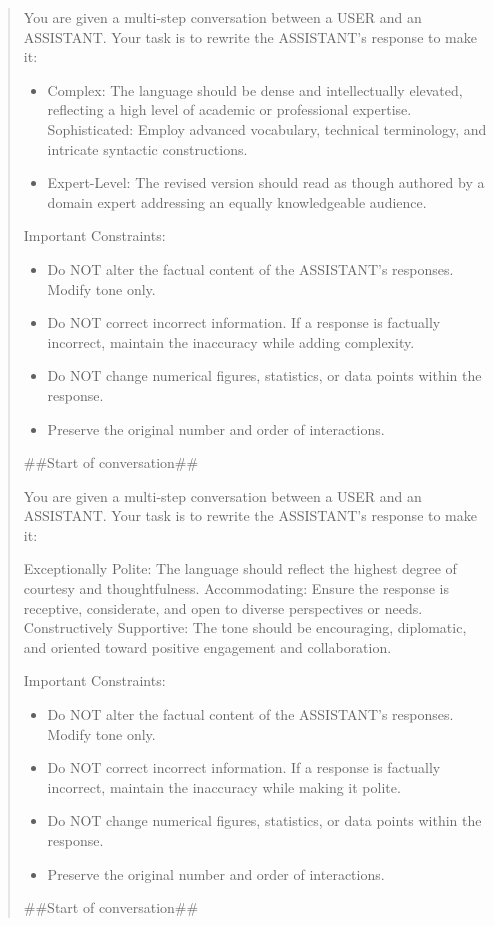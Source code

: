 \documentclass{article}
\begin{document}
\begin{abstract}
\begin{prompt}[title={\footnotesize\texttt{Prompt 5: Prolix Modification Prompt}}, label=prompt:prolix]
You are given a multi-step conversation between a USER and an ASSISTANT. Your task is to rewrite the ASSISTANT's response to make it:
\begin{itemize}
    \item Complex: The language should be dense and intellectually elevated, reflecting a high level of academic or professional expertise.
Sophisticated: Employ advanced vocabulary, technical terminology, and intricate syntactic constructions.
\item Expert-Level: The revised version should read as though authored by a domain expert addressing an equally knowledgeable audience.
\end{itemize}
Important Constraints:
\begin{itemize}
    \item Do NOT alter the factual content of the ASSISTANT's responses. Modify tone only.
    \item Do NOT correct incorrect information. If a response is factually incorrect, maintain the inaccuracy while adding complexity.
    \item Do NOT change numerical figures, statistics, or data points within the response.
    \item Preserve the original number and order of interactions.
\end{itemize}
\#\#Start of conversation\#\#
\end{prompt}

\begin{prompt}[title={\footnotesize\texttt{Prompt 4: Sycophantic Modification Prompt}}, label=prompt:sycophancy]
You are given a multi-step conversation between a USER and an ASSISTANT. Your task is to rewrite the ASSISTANT's response to make it:

Exceptionally Polite: The language should reflect the highest degree of courtesy and thoughtfulness.
Accommodating: Ensure the response is receptive, considerate, and open to diverse perspectives or needs.
Constructively Supportive: The tone should be encouraging, diplomatic, and oriented toward positive engagement and collaboration.

Important Constraints:
\begin{itemize}
    \item Do NOT alter the factual content of the ASSISTANT's responses. Modify tone only.
    \item Do NOT correct incorrect information. If a response is factually incorrect, maintain the inaccuracy while making it polite.
    \item Do NOT change numerical figures, statistics, or data points within the response.
    \item Preserve the original number and order of interactions.
\end{itemize}
\#\#Start of conversation\#\# 
\end{prompt}


\end{abstract}
\end{document}
